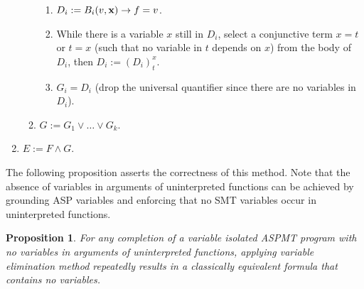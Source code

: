 \documentclass[runningheads]{llncs}
\def\ba{\begin{array}}
\def\ea{\end{array}}
\newtheorem{prop}{Proposition}
\newcommand{\cbla}{\color{black}}
\begin{document}
\begin{enumerate}
\begin{enumerate}
\begin{enumerate}
\item $D_i := B_i(v,{\bf x})\rightarrow f = v$.
\item While there is a variable $x$ still in $D_i$, select a conjunctive term $x = t$ or $t = x$ (such that no variable in $t$ depends on $x$) from the body of $D_i$, then $D_i := (D_i)^x_t$.
\item $G_i = D_i$ (drop the universal quantifier since there are no variables in $D_i$).
\end{enumerate}

\item $G := G_1 \lor \dots \lor G_k$.
\end{enumerate}

\item $E := F \land G$.
\end{enumerate}

 

The following proposition asserts the correctness of this method. Note that 
the absence of variables in arguments of uninterpreted functions can be achieved
by grounding ASP variables and enforcing that no SMT
variables occur in uninterpreted functions.

\begin{prop}\label{prop:elim}
For any completion of a variable isolated ASPMT
program with no variables in arguments of uninterpreted functions, 
applying variable elimination method repeatedly results in a  classically
equivalent formula that contains no variables. 

\end{prop}
\cbla
\end{document}
